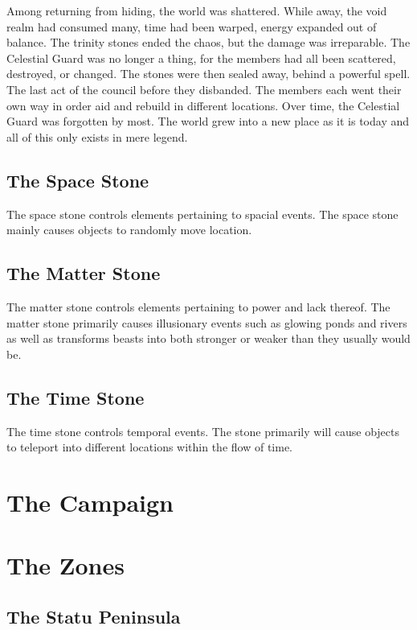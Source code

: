 \documentclass[letterpaper,10pt,twoside,twocolumn,openany]{book}
\begin{document}
Among returning from hiding, the world was shattered. While away, the void realm had consumed many, time had been warped, energy expanded out of balance. The trinity stones ended the chaos, but the damage was irreparable. The Celestial Guard was no longer a thing, for the members had all been scattered, destroyed, or changed. The stones were then sealed away, behind a powerful spell. The last act of the council before they disbanded. The members each went their own way in order aid and rebuild in different locations. Over time, the Celestial Guard was forgotten by most. The world grew into a new place as it is today and all of this only exists in mere legend.  

\section{The Space Stone}

The space stone controls elements pertaining to spacial events. The space stone mainly causes objects to randomly move location.


\section{The Matter Stone}

The matter stone controls elements pertaining to power and lack thereof. The matter stone primarily causes illusionary events such as glowing ponds and rivers as well as transforms beasts into both stronger or weaker than they usually would be.

\section{The Time Stone}

The time stone controls temporal events. The stone primarily will cause objects to teleport into different locations within the flow of time.

\chapter{The Campaign}




\chapter{The Zones}

\section{The Statu Peninsula}
\end{document}
